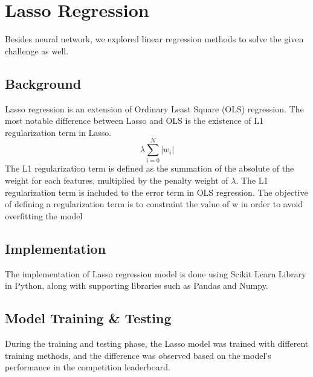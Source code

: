 \section{Lasso Regression} \label{sec:lasso}
Besides neural network, we explored linear regression methods to solve the given challenge as well.

\subsection{Background}
Lasso regression is an extension of Ordinary Least Square (OLS) regression. The most notable difference between Lasso and OLS is the existence of L1 regularization term in Lasso.
\begin{equation}
\label{eq:l1_regularization}
\lambda \sum_{i=0}^{N} |w_i|
\end{equation}
The L1 regularization term is defined as the summation of the absolute of the weight for each features, multiplied by the penalty weight of $\lambda$. The L1 regularization term is included to the error term in OLS regression. The objective of defining a regularization term is to constraint the value of w in order to avoid overfitting the model

\subsection{Implementation}
The implementation of Lasso regression model is done using Scikit Learn Library in Python, along with supporting libraries such as Pandas and Numpy.

\subsection{Model Training \& Testing}
During the training and testing phase, the Lasso model was trained with different training methods, and the difference was observed based on the model's performance in the competition leaderboard.

